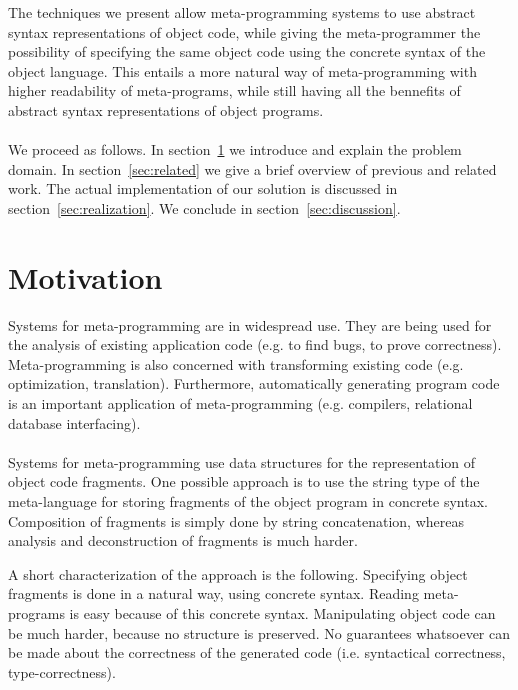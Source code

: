 \documentclass[a4paper,11pt]{article}
\begin{document}
The techniques we present allow meta-programming systems to use abstract
syntax representations of object code, while giving the meta-programmer the
possibility of specifying the same object code using the concrete syntax of
the object language. This entails a more natural way of meta-programming with
higher readability of meta-programs, while still having all the bennefits of
abstract syntax representations of object programs.

\paragraph{}

We proceed as follows. In section~\ref{sec:motivation} we introduce and explain
the problem domain. In section~\ref{sec:related} we give a brief overview of
previous and related work. The actual implementation of our solution is
discussed in section~\ref{sec:realization}. We conclude in section~\ref{sec:discussion}.


\section{Motivation}\label{sec:motivation}

Systems for meta-programming are in widespread use. They are being used for
the analysis of existing application code (e.g. to find bugs, to prove
correctness). Meta-programming is also concerned with transforming existing
code (e.g. optimization, translation). Furthermore, automatically generating
program code is an important application of meta-programming (e.g. compilers,
relational database interfacing).

\paragraph{}

Systems for meta-programming use data structures for the representation of
object code fragments. One possible approach is to use the string type of the
meta-language for storing fragments of the object program in concrete syntax.
Composition of fragments is simply done by string concatenation, whereas
analysis and deconstruction of fragments is much harder.

A short characterization of the approach is the following. Specifying object
fragments is done in a natural way, using concrete syntax. Reading
meta-programs is easy because of this concrete syntax. Manipulating object
code can be much harder, because no structure is preserved. No guarantees
whatsoever can be made about the correctness of the generated code (i.e.
syntactical correctness, type-correctness).
\end{document}
